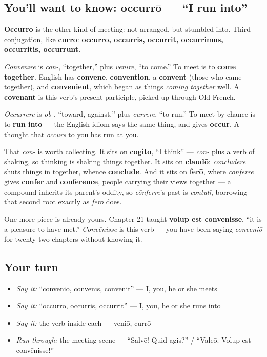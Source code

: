 \subsection*{You'll want to know: occurrō — \textquotedblleft{}I run into\textquotedblright{}}
\textbf{Occurrō} is the other kind of meeting: not arranged, but stumbled into. Third conjugation, like \textbf{currō}: \textbf{occurrō, occurris, occurrit, occurrimus, occurritis, occurrunt}.

\begin{cousinweb}
\emph{Convenīre} is \emph{con-}, \textquotedblleft{}together,\textquotedblright{} plus \emph{venīre}, \textquotedblleft{}to come.\textquotedblright{} To meet is to \textbf{come together}. English has \textbf{convene}, \textbf{convention}, a \textbf{convent} (those who came together), and \textbf{convenient}, which began as things \emph{coming together} well. A \textbf{covenant} is this verb's present participle, picked up through Old French.

\emph{Occurrere} is \emph{ob-}, \textquotedblleft{}toward, against,\textquotedblright{} plus \emph{currere}, \textquotedblleft{}to run.\textquotedblright{} To meet by chance is to \textbf{run into} — the English idiom says the same thing, and gives \textbf{occur}. A thought that \emph{occurs} to you has run at you.

That \emph{con-} is worth collecting. It sits on \textbf{cōgitō}, \textquotedblleft{}I think\textquotedblright{} — \emph{con-} plus a verb of shaking, so thinking is shaking things together. It sits on \textbf{claudō}: \emph{conclūdere} shuts things in together, whence \textbf{conclude}. And it sits on \textbf{ferō}, where \emph{cōnferre} gives \textbf{confer} and \textbf{conference}, people carrying their views together — a compound inherits its parent's oddity, so \emph{cōnferre}'s past is \emph{contulī}, borrowing that second root exactly as \emph{ferō} does.

One more piece is already yours. Chapter 21 taught \textbf{volup est convēnisse}, \textquotedblleft{}it is a pleasure to have met.\textquotedblright{} \emph{Convēnisse} is this verb — you have been saying \emph{conveniō} for twenty-two chapters without knowing it.
\end{cousinweb}

\subsection*{Your turn}
\begin{itemize}
\raggedright
  \item \emph{Say it:} \textquotedblleft{}conveniō, convenīs, convenit\textquotedblright{} — I, you, he or she meets
  \item \emph{Say it:} \textquotedblleft{}occurrō, occurris, occurrit\textquotedblright{} — I, you, he or she runs into
  \item \emph{Say it:} the verb inside each — veniō, currō
  \item \emph{Run through:} the meeting scene — \textquotedblleft{}Salvē! Quid agis?\textquotedblright{} / \textquotedblleft{}Valeō. Volup est convēnisse!\textquotedblright{}
\end{itemize}

